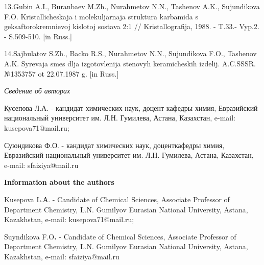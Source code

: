 13.Gubin A.I., Buranbaev M.Zh., Nurahmetov N.N., Tashenov A.K.,
Sujundikova F.O. Kristallicheskaja i molekuljarnaja struktura karbamida
s geksaftorokremnievoj kislotoj sostava 2:1 // Kristallografija, 1988. -
T.33.- Vyp.2. - S.509-510. {[}in Russ.{]}

14.Sajbulatov S.Zh., Backo R.S., Nurahmetov N.N., Sujundikova F.O.,
Tashenov A.K. Syr\textquotesingle evaja smes\textquotesingle{} dlja
izgotovlenija stenovyh keramicheskih izdelij. A.C.SSSR. №1353757 ot
22.07.1987 g. {[}in Russ.{]}

\emph{Сведение об авторах}

Кусепова Л.А. - кандидат химических наук, доцент кафедры химия,
Евразийский национальный университет им. Л.Н. Гумилева, Астана,
Казахстан, e-mail: kusepova71@mail.ru;

Суюндикова Ф.О. - кандидат химических наук, доценткафедры химия,
Евразийский национальный университет им. Л.Н. Гумилева, Астана,
Казахстан, e-mail: sfaiziya@mail.ru

{\bfseries Information about the authors}

Kusepova L.А. - Candidate of Chemical Sciences, Associate Professor of
Department Chemistry, L.N. Gumilyov Eurasian National University,
Astana, Kazakhstan, e-mail: kusepova71@mail.ru;

Suyndikova F.O{\bfseries .} - Candidate of Chemical Sciences, Associate
Professor of Department Chemistry, L.N. Gumilyov Eurasian National
University, Astana, Kazakhstan, e-mail: sfaiziya@mail.ru
